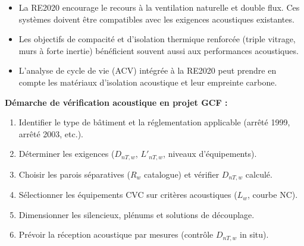 \begin{itemize}
  \item La RE2020 encourage le recours à la ventilation naturelle et double flux. Ces systèmes doivent être compatibles avec les exigences acoustiques existantes.
  \item Les objectifs de compacité et d'isolation thermique renforcée (triple vitrage, murs à forte inertie) bénéficient souvent aussi aux performances acoustiques.
  \item L'analyse de cycle de vie (ACV) intégrée à la RE2020 peut prendre en compte les matériaux d'isolation acoustique et leur empreinte carbone.
\end{itemize}

\begin{methode}
\textbf{Démarche de vérification acoustique en projet GCF :}
\begin{enumerate}
  \item Identifier le type de bâtiment et la réglementation applicable (arrêté 1999, arrêté 2003, etc.).
  \item Déterminer les exigences ($D_{nT,w}$, $L'_{nT,w}$, niveaux d'équipements).
  \item Choisir les parois séparatives ($R_w$ catalogue) et vérifier $D_{nT,w}$ calculé.
  \item Sélectionner les équipements CVC sur critères acoustiques ($L_w$, courbe NC).
  \item Dimensionner les silencieux, plénums et solutions de découplage.
  \item Prévoir la réception acoustique par mesures (contrôle $D_{nT,w}$ in situ).
\end{enumerate}
\end{methode}

